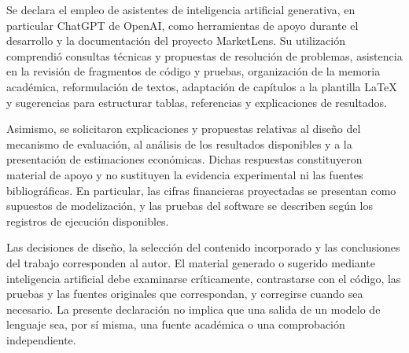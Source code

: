 
Se declara el empleo de asistentes de inteligencia artificial generativa, en particular ChatGPT de OpenAI, como herramientas de apoyo durante el desarrollo y la documentación del proyecto MarketLens. Su utilización comprendió consultas técnicas y propuestas de resolución de problemas, asistencia en la revisión de fragmentos de código y pruebas, organización de la memoria académica, reformulación de textos, adaptación de capítulos a la plantilla \LaTeX{} y sugerencias para estructurar tablas, referencias y explicaciones de resultados.

Asimismo, se solicitaron explicaciones y propuestas relativas al diseño del mecanismo de evaluación, al análisis de los resultados disponibles y a la presentación de estimaciones económicas. Dichas respuestas constituyeron material de apoyo y no sustituyen la evidencia experimental ni las fuentes bibliográficas. En particular, las cifras financieras proyectadas se presentan como supuestos de modelización, y las pruebas del software se describen según los registros de ejecución disponibles.

Las decisiones de diseño, la selección del contenido incorporado y las conclusiones del trabajo corresponden al autor. El material generado o sugerido mediante inteligencia artificial debe examinarse críticamente, contrastarse con el código, las pruebas y las fuentes originales que correspondan, y corregirse cuando sea necesario. La presente declaración no implica que una salida de un modelo de lenguaje sea, por sí misma, una fuente académica o una comprobación independiente.

